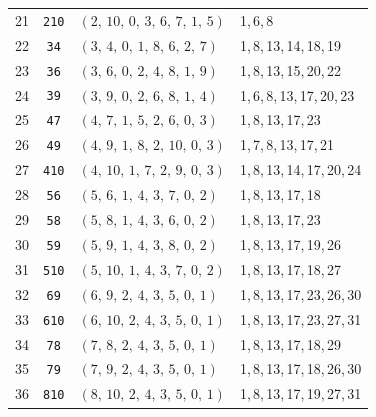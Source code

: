 \begin{longtable}{r c p{} p{}}
21 & \texttt{210} & $(2,\,10,\,0,\,3,\,6,\,7,\,1,\,5)$ & 1,\,6,\,8 \\
22 & \texttt{34} & $(3,\,4,\,0,\,1,\,8,\,6,\,2,\,7)$ & 1,\,8,\,13,\,14,\,18,\,19 \\
23 & \texttt{36} & $(3,\,6,\,0,\,2,\,4,\,8,\,1,\,9)$ & 1,\,8,\,13,\,15,\,20,\,22 \\
24 & \texttt{39} & $(3,\,9,\,0,\,2,\,6,\,8,\,1,\,4)$ & 1,\,6,\,8,\,13,\,17,\,20,\,23 \\
25 & \texttt{47} & $(4,\,7,\,1,\,5,\,2,\,6,\,0,\,3)$ & 1,\,8,\,13,\,17,\,23 \\
26 & \texttt{49} & $(4,\,9,\,1,\,8,\,2,\,10,\,0,\,3)$ & 1,\,7,\,8,\,13,\,17,\,21 \\
27 & \texttt{410} & $(4,\,10,\,1,\,7,\,2,\,9,\,0,\,3)$ & 1,\,8,\,13,\,14,\,17,\,20,\,24 \\
28 & \texttt{56} & $(5,\,6,\,1,\,4,\,3,\,7,\,0,\,2)$ & 1,\,8,\,13,\,17,\,18 \\
29 & \texttt{58} & $(5,\,8,\,1,\,4,\,3,\,6,\,0,\,2)$ & 1,\,8,\,13,\,17,\,23 \\
30 & \texttt{59} & $(5,\,9,\,1,\,4,\,3,\,8,\,0,\,2)$ & 1,\,8,\,13,\,17,\,19,\,26 \\
31 & \texttt{510} & $(5,\,10,\,1,\,4,\,3,\,7,\,0,\,2)$ & 1,\,8,\,13,\,17,\,18,\,27 \\
32 & \texttt{69} & $(6,\,9,\,2,\,4,\,3,\,5,\,0,\,1)$ & 1,\,8,\,13,\,17,\,23,\,26,\,30 \\
33 & \texttt{610} & $(6,\,10,\,2,\,4,\,3,\,5,\,0,\,1)$ & 1,\,8,\,13,\,17,\,23,\,27,\,31 \\
34 & \texttt{78} & $(7,\,8,\,2,\,4,\,3,\,5,\,0,\,1)$ & 1,\,8,\,13,\,17,\,18,\,29 \\
35 & \texttt{79} & $(7,\,9,\,2,\,4,\,3,\,5,\,0,\,1)$ & 1,\,8,\,13,\,17,\,18,\,26,\,30 \\
36 & \texttt{810} & $(8,\,10,\,2,\,4,\,3,\,5,\,0,\,1)$ & 1,\,8,\,13,\,17,\,19,\,27,\,31 \\
\end{longtable}
